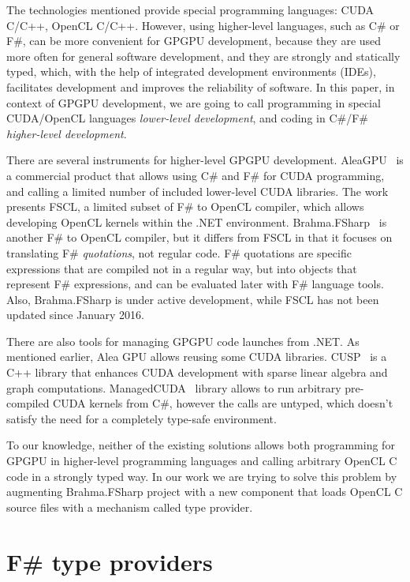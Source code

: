 \documentclass[sigplan]{acmart}\settopmatter{}
\begin{document}
The technologies mentioned provide special programming languages: CUDA C/C++, OpenCL C/C++. However, using higher-level languages, such as C\# or F\#, can be more convenient for GPGPU development, because they are used more often for general software development, and they are strongly and statically typed, which, with the help of integrated development environments (IDEs), facilitates development and improves the reliability of software. In this paper, in context of GPGPU development, we are going to call programming in special CUDA/OpenCL languages \textit{lower-level development}, and coding in C\#/F\# \textit{higher-level development}.

There are several instruments for higher-level GPGPU development. AleaGPU~\cite{AleaGPU} is a commercial product that allows using C\# and F\# for CUDA programming, and calling a limited number of included lower-level CUDA libraries. The work~\cite{FSCL} presents FSCL, a limited subset of F\# to OpenCL compiler, which allows developing OpenCL kernels within the .NET environment.
Brahma.FSharp~\cite{Brahma_FSharp} is another F\# to OpenCL compiler, but it differs from FSCL in that it focuses on translating F\# \textit{quotations}, not regular code.
F\# quotations are specific expressions that are compiled not in a regular way, but into objects that represent F\# expressions, and can be evaluated later with F\# language tools.
Also, Brahma.FSharp is under active development, while FSCL has not been updated since January 2016.

There are also tools for managing GPGPU code launches from .NET. As mentioned earlier, Alea GPU allows reusing some CUDA libraries. CUSP~\cite{CUSP} is a C++ library that enhances CUDA development with sparse linear algebra and graph computations. ManagedCUDA~\cite{ManagedCUDA} library allows to run arbitrary pre-compiled CUDA kernels from C\#, however the calls are untyped, which doesn't satisfy the need for a completely type-safe environment.

To our knowledge, neither of the existing solutions allows both programming for GPGPU in higher-level programming languages and calling arbitrary OpenCL C code in a strongly typed way. In our work we are trying to solve this problem by augmenting Brahma.FSharp project with a new component that loads OpenCL C source files with a mechanism called type provider.

\section{F\# type providers}
\end{document}
